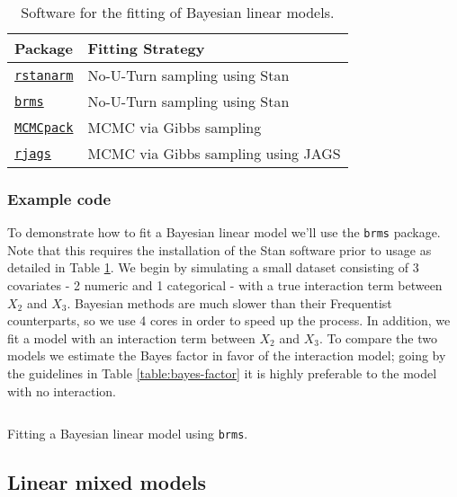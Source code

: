 \documentclass{report}
\begin{document}
\begin{table}[h!]
\centering
\begin{tabular}{||l l||}
  \hline
  \textbf{Package} & \textbf{Fitting Strategy} \\ [0.5ex]
  \hline\hline
  \href{https://cran.r-project.org/web/packages/rstanarm/index.html}{\texttt{rstanarm}} & No-U-Turn sampling using Stan \\
  \hline 
  \href{https://cran.r-project.org/web/packages/brms/index.html}{\texttt{brms}} & No-U-Turn sampling using Stan \\
  \hline 
  \href{https://cran.r-project.org/web/packages/MCMCpack/index.html}{\texttt{MCMCpack}} & MCMC via Gibbs sampling \\
  \hline 
  \href{https://cran.r-project.org/web/packages/rjags/index.html}{\texttt{rjags}} & MCMC via Gibbs sampling using JAGS \\
  \hline 
\end{tabular}
\caption{Software for the fitting of Bayesian linear models.}
\label{table:bayes-software}
\end{table}

\subsubsection{Example code}

To demonstrate how to fit a Bayesian linear model we'll use the \texttt{brms} package. Note that this requires the installation of the Stan software prior to usage as detailed in Table \ref{table:bayes-software}. We begin by simulating a small dataset consisting of 3 covariates - 2 numeric and 1 categorical - with a true interaction term between $X_2$ and $X_3$. Bayesian methods are much slower than their Frequentist counterparts, so we use 4 cores in order to speed up the process. In addition, we fit a model with an interaction term between $X_2$ and $X_3$. To compare the two models we estimate the Bayes factor in favor of the interaction model; going by the guidelines in Table \ref{table:bayes-factor} it is highly preferable to the model with no interaction. 

\begin{listing}[h!]
\inputminted{r}{Example-Code/brms_linear_model.R}
\caption{Fitting a Bayesian linear model using \texttt{brms}.}
\label{listing:brms-example}
\end{listing}

\subsection{Linear mixed models}
\end{document}

